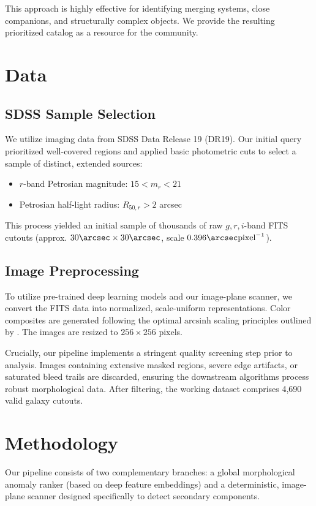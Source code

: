 \documentclass[twocolumn]{aastex631}
\begin{document}
This approach is highly effective for identifying merging systems, close companions, and structurally complex objects. We provide the resulting prioritized catalog as a resource for the community.

\section{Data} \label{sec:data}

\subsection{SDSS Sample Selection}
We utilize imaging data from SDSS Data Release 19 (DR19). Our initial query prioritized well-covered regions and applied basic photometric cuts to select a sample of distinct, extended sources:
\begin{itemize}
    \item $r$-band Petrosian magnitude: $15 < m_r < 21$
    \item Petrosian half-light radius: $R_{50, r} > 2$ arcsec
\end{itemize}
This process yielded an initial sample of thousands of raw $g, r, i$-band FITS cutouts (approx. $30\arcsec \times 30\arcsec$, scale $0.396\arcsec \mathrm{pixel}^{-1}$).

\subsection{Image Preprocessing}
To utilize pre-trained deep learning models and our image-plane scanner, we convert the FITS data into normalized, scale-uniform representations. Color composites are generated following the optimal $\mathrm{arcsinh}$ scaling principles outlined by \citet{lupton2004}. The images are resized to $256 \times 256$ pixels. 

Crucially, our pipeline implements a stringent quality screening step prior to analysis. Images containing extensive masked regions, severe edge artifacts, or saturated bleed trails are discarded, ensuring the downstream algorithms process robust morphological data. After filtering, the working dataset comprises 4,690 valid galaxy cutouts.

\section{Methodology} \label{sec:methods}

Our pipeline consists of two complementary branches: a global morphological anomaly ranker (based on deep feature embeddings) and a deterministic, image-plane scanner designed specifically to detect secondary components.
\end{document}
